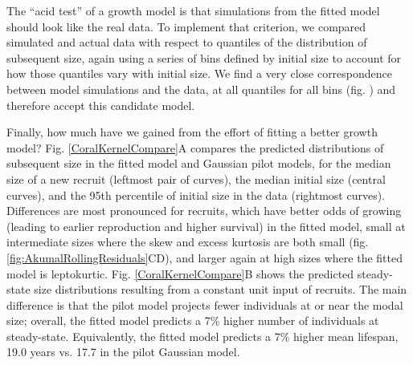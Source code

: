 \documentclass[11pt]{article}
\begin{document}
{The ``acid test'' of a growth model is that simulations from the fitted model should look like the real data. 
To implement that criterion, we compared simulated and actual data with respect to quantiles of the distribution
of subsequent size, again using a series of bins defined by initial size to account for how those quantiles vary
with initial size. We find a very close correspondence between model simulations and the data, at all quantiles for all bins
(fig. ) and therefore accept this candidate model. 
 

Finally, how much have we gained from the effort of fitting a better growth model? Fig. \ref{CoralKernelCompare}A
compares the predicted distributions of subsequent size in the fitted model and Gaussian pilot models, for the median size of a new recruit 
(leftmost pair of curves), the median initial size (central curves), and the 95th percentile of initial size in the data (rightmost
curves). Differences are most pronounced for recruits, which have better odds of growing (leading to earlier reproduction and higher
survival) in the fitted model, small at intermediate sizes where the skew and excess kurtosis are both small (fig. \ref{fig:AkumalRollingResiduals}CD),
and larger again at high sizes where the fitted model is leptokurtic. Fig. \ref{CoralKernelCompare}B shows the predicted steady-state size
distributions resulting from a constant unit input of recruits. The main difference is that the pilot model projects fewer individuals at
or near the modal size; overall, the fitted model predicts a 7\% higher number of individuals at steady-state. Equivalently, the fitted
model predicts a 7\% higher mean lifespan,  19.0 years vs. 17.7 in the pilot Gaussian model. 
 

}
\end{document}
